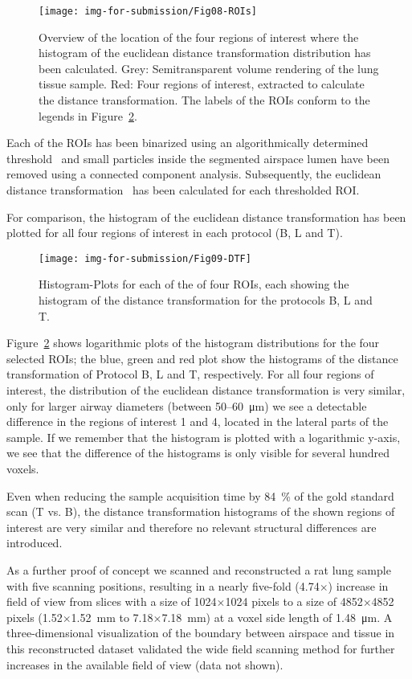 \begin{figure}
	\centering
	\caption{Overview of the location of the four regions of interest where the histogram of the euclidean distance transformation distribution has been calculated. Grey: Semitransparent volume rendering of the lung tissue sample. Red: Four regions of interest, extracted to calculate the distance transformation. The labels of the ROIs conform to the legends in Figure~\ref{fig:DTFplots}.}%
	\texttt{[image: img-for-submission/Fig08-ROIs]}
	\label{fig:roi3d}
\end{figure}

Each of the ROIs has been binarized using an algorithmically determined threshold~\cite{Otsu1979} and small particles inside the segmented airspace lumen have been removed using a connected component analysis. Subsequently, the euclidean distance transformation~\cite{Danielsson1980} has been calculated for each thresholded ROI.

For comparison, the histogram of the euclidean distance transformation has been plotted for all four regions of interest in each protocol (B, L and T).

\begin{figure}
	\centering
	\caption{Histogram-Plots for each of the of four ROIs, each showing the histogram of the distance transformation for the protocols B, L and T.}%
	\texttt{[image: img-for-submission/Fig09-DTF]}
	\label{fig:DTFplots}
\end{figure}

Figure~\ref{fig:DTFplots} shows logarithmic plots of the histogram distributions for the four selected ROIs; the blue, green and red plot show the histograms of the distance transformation of Protocol B, L and T, respectively. For all four regions of interest, the distribution of the euclidean distance transformation is very similar, only for larger airway diameters (between 50--\SI{60}{\micro\meter}) we see a detectable difference in the regions of interest 1 and 4, located in the lateral parts of the sample. If we remember that the histogram is plotted with a logarithmic y-axis, we see that the difference of the histograms is only visible for several hundred voxels.

Even when reducing the sample acquisition time by \SI{84}{\percent} of the gold standard scan (T vs. B), the distance transformation histograms of the shown regions of interest are very similar and therefore no relevant structural differences are introduced.

As a further proof of concept we scanned and reconstructed a rat lung sample with five scanning positions, resulting in a nearly five-fold (4.74$\times$) increase in field of view from slices with a size of 1024$\times$1024 pixels to a size of 4852$\times$4852 pixels (1.52$\times$\SI{1.52}{\milli\meter} to 7.18$\times$\SI{7.18}{\milli\meter}) at a voxel side length of \SI{1.48}{\micro\meter}. A three-dimensional visualization of the boundary between airspace and tissue in this reconstructed dataset validated the wide field scanning method for further increases in the available field of view (data not shown).